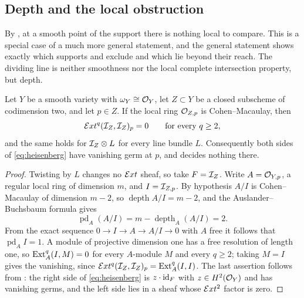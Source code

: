 \subsection{Depth and the local obstruction}
\label{ssec:depth}

By , at a smooth point of the support there is
nothing local to compare. This is a special case of a much more general
statement, and the general statement shows exactly which supports
 and  exclude and which
lie beyond their reach. The dividing line is neither smoothness nor the local
complete intersection property, but depth.

\begin{theorem}%
\label{thm:cmvanishing}
Let $Y$ be a smooth variety with $\omega_{Y}\cong\mathcal{O}_{Y}$, let $Z\subset Y$ be
a closed subscheme of codimension two, and let $p\in Z$. If the local ring
$\mathcal{O}_{Z,p}$ is Cohen--Macaulay, then
\[
  \mathcal{E} xt^{q}(\mathcal{I}_{Z},\mathcal{I}_{Z})_{p}=0\qquad\text{for every }q\ge2 ,
\]
and the same holds for $\mathcal{I}_{Z}\otimes L$ for every line bundle $L$.
Consequently both sides of \eqref{eq:heisenberg} have vanishing germ at $p$,
and  decides nothing there.
\end{theorem}

\begin{proof}
Twisting by $L$ changes no $\mathcal{E} xt$ sheaf, so take $F=\mathcal{I}_{Z}$. Write
$A=\mathcal{O}_{Y,p}$, a regular local ring of dimension $m$, and $I=\mathcal{I}_{Z,p}$. By
hypothesis $A/I$ is Cohen--Macaulay of dimension $m-2$, so
$\operatorname{depth}A/I=m-2$, and the Auslander--Buchsbaum formula gives
\[
  \operatorname{pd}_{A}(A/I)=m-\operatorname{depth}_{A}(A/I)=2 .
\]
From the exact sequence $0\to I\to A\to A/I\to0$ with $A$ free it follows that
$\operatorname{pd}_{A}I=1$. A module of projective dimension one has a free
resolution of length one, so $\operatorname{Ext}^{q}_{A}(I,M)=0$ for every $A$-module $M$
and every $q\ge2$; taking $M=I$ gives the vanishing, since
$\mathcal{E} xt^{q}(\mathcal{I}_{Z},\mathcal{I}_{Z})_{p}=\operatorname{Ext}^{q}_{A}(I,I)$. The last assertion
follows from : the right side of \eqref{eq:heisenberg} is
$z\cdot\operatorname{id}_{F}$ with $z\in H^{2}(\mathcal{O}_{Y})$ and has vanishing germs, and the
left side lies in a sheaf whose $\mathcal{E} xt^{2}$ factor is zero.
\end{proof}

